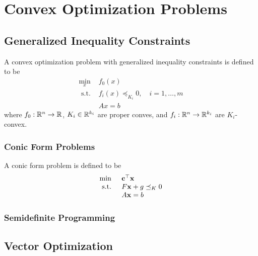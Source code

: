 \chapter{Convex Optimization Problems}

\section{Generalized Inequality Constraints}

\begin{definition}
	A convex optimization problem with generalized inequality constraints is defined to be
	\begin{equation}
		\begin{array}{ll}
			\min_x        & f_{0}(x)                                    \\
			\text{ s.t. } & f_{i}(x)\preceq_{K_{i}}0,\quad i=1,\ldots,m \\
			              & Ax=b
		\end{array}
	\end{equation}
	where \(f_{0}:\mathbb{R}^n\rightarrow\mathbb{R}\), \(K_i\in\mathbb{R}^{k_i}\) are proper conves, and \(f_i:\mathbb{R}^n\rightarrow\mathbb{R}^{k_i}\) are \(K_i\)-convex.
\end{definition}

\subsection{Conic Form Problems}

\begin{definition}
	A conic form problem is defined to be
	\begin{equation}
		\begin{array}{ll}
			\min          & \mathbf{c}^{\top}\mathbf{x}     \\
			\text{ s.t. } & F\mathbf{x}+g\preceq_{K}0 \\
			              & A\mathbf{x}=b
		\end{array}
	\end{equation}
\end{definition}

\subsection{Semidefinite Programming}

\section{Vector Optimization}
